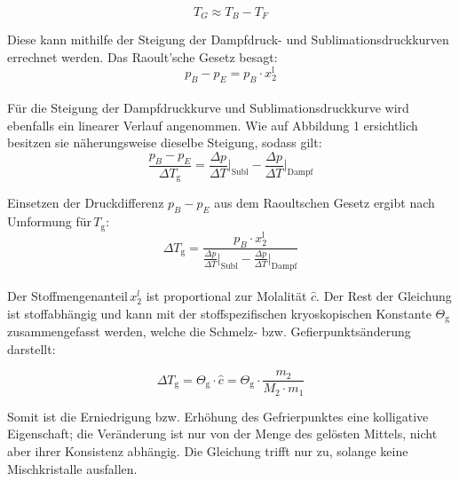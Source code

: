 \documentclass[12pt,a4paper,titlepage,headinclude,bibtotoc]{scrartcl}
\begin{document}
\begin{equation}
T_G \approx T_B - T_F
\end{equation}

\newpage

Diese kann mithilfe der Steigung der Dampfdruck- und Sublimationsdruckkurven errechnet werden. Das Raoult'sche Gesetz besagt:\\

\begin{equation}
p_B - p_E = p_B \cdot x_2^\mathrm{l}
\end{equation}
\\

Für die Steigung der Dampfdruckkurve und Sublimationsdruckkurve wird ebenfalls ein linearer Verlauf angenommen. Wie auf Abbildung 1 ersichtlich besitzen sie näherungsweise dieselbe Steigung, sodass gilt:\\

\begin{equation}
\dfrac{p_B - p_E}{\Delta T_\mathrm{g}} = \frac{\Delta p}{\Delta T}\bigg \vert_\mathrm{Subl} - \frac{\Delta p}{\Delta T}\bigg \vert_\mathrm{Dampf}
\end{equation}

Einsetzen der Druckdifferenz $p_B - p_E$ aus dem Raoultschen Gesetz ergibt nach Umformung für\,$T_\mathrm{g}$:\\

\begin{equation}
\Delta T_\mathrm{g} =\dfrac{p_B \cdot x_2^\mathrm{l}}{\frac{\Delta p}{\Delta T}\bigg \vert_\mathrm{Subl} - \frac{\Delta p}{\Delta T}\bigg \vert_\mathrm{Dampf}}
\end{equation}
\\

Der Stoffmengenanteil\,$x_2^l$ ist proportional zur Molalität $ \hat{c}$. Der Rest der Gleichung ist stoffabhängig und kann mit der stoffspezifischen kryoskopischen Konstante $\Theta_\mathrm{g}$ zusammengefasst werden, welche die Schmelz- bzw. Gefierpunktsänderung darstellt:

\begin{equation}
\Delta T_\mathrm{g} = \mathit{\Theta_\mathrm{g}} \cdot \hat{c} = \mathit{\Theta_\mathrm{g}} \cdot \frac{m_\mathrm{2}}{M_\mathrm{2} \cdot m_\mathrm{1}}
\end{equation}

Somit ist die Erniedrigung bzw. Erhöhung des Gefrierpunktes eine kolligative Eigenschaft; die Veränderung ist nur von der Menge des gelösten Mittels, nicht aber ihrer Konsistenz abhängig. Die Gleichung trifft nur zu, solange keine Mischkristalle ausfallen.\\
\end{document}
